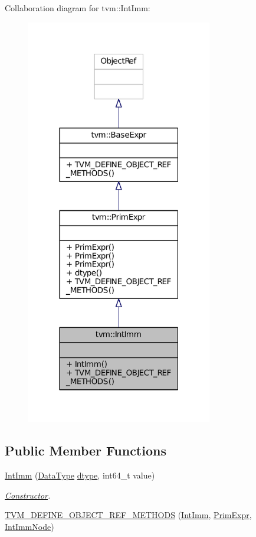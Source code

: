 Collaboration diagram for tvm\+:\+:Int\+Imm\+:
\nopagebreak
\begin{figure}[H]
\begin{center}
\leavevmode
\includegraphics[width=230pt]{classtvm_1_1IntImm__coll__graph}
\end{center}
\end{figure}
\subsection*{Public Member Functions}
\begin{DoxyCompactItemize}
\item 
\hyperlink{classtvm_1_1IntImm_ac168017343d2153f801adb31338fafce}{Int\+Imm} (\hyperlink{namespacetvm_a41918af1a1dc386388639a9d3ad06c5d}{Data\+Type} \hyperlink{classtvm_1_1PrimExpr_a1098008618699c33adfbd19e582f9ffd}{dtype}, int64\+\_\+t value)
\begin{DoxyCompactList}\small\item\em \hyperlink{classtvm_1_1Constructor}{Constructor}. \end{DoxyCompactList}\item 
\hyperlink{classtvm_1_1IntImm_a9ce59db1a112fb10b7f384b68a3afc9f}{T\+V\+M\+\_\+\+D\+E\+F\+I\+N\+E\+\_\+\+O\+B\+J\+E\+C\+T\+\_\+\+R\+E\+F\+\_\+\+M\+E\+T\+H\+O\+DS} (\hyperlink{classtvm_1_1IntImm}{Int\+Imm}, \hyperlink{classtvm_1_1PrimExpr}{Prim\+Expr}, \hyperlink{classtvm_1_1IntImmNode}{Int\+Imm\+Node})
\end{DoxyCompactItemize}


